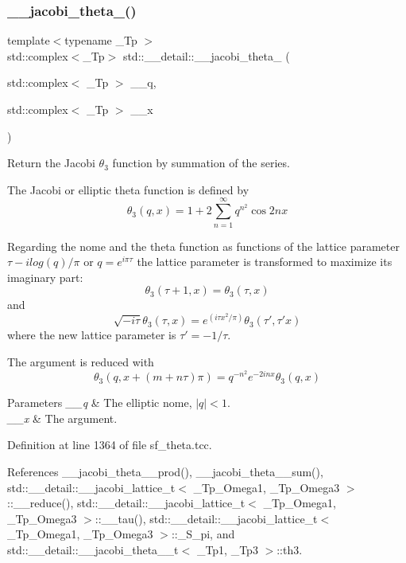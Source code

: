 \subsubsection{\texorpdfstring{\+\_\+\+\_\+jacobi\+\_\+theta\+\_()}{\_\_jacobi\_theta\_3()}\hspace{0.1cm}{\footnotesize\ttfamily [1/2]}}
{\footnotesize\ttfamily template$<$typename \+\_\+\+Tp $>$ \\
std\+::complex$<$\+\_\+\+Tp$>$ std\+::\+\_\+\+\_\+detail\+::\+\_\+\+\_\+jacobi\+\_\+theta\+\_ (\begin{DoxyParamCaption}\item[{std\+::complex$<$ \+\_\+\+Tp $>$}]{\+\_\+\+\_\+q,  }\item[{std\+::complex$<$ \+\_\+\+Tp $>$}]{\+\_\+\+\_\+x }\end{DoxyParamCaption})}

Return the Jacobi $ \theta_3 $ function by summation of the series.

The Jacobi or elliptic theta function is defined by \[ \theta_3(q,x) = 1 + 2\sum_{n=1}^{\infty} q^{n^2}\cos{2nx} \]

Regarding the nome and the theta function as functions of the lattice parameter $ \tau -i log(q)/ \pi $ or $ q = e^{i\pi\tau} $ the lattice parameter is transformed to maximize its imaginary part\+: \[ \theta_3(\tau+1,x) = \theta_3(\tau,x) \] and \[ \sqrt{-i\tau}\theta_3(\tau,x) = e^{(i\tau x^2/\pi)}\theta_3(\tau',\tau' x) \] where the new lattice parameter is $ \tau' = -1/\tau $.

The argument is reduced with \[ \theta_3(q, x + (m+n\tau)\pi) = q^{-n^2} e^{-2inx} \theta_3(q, x) \]


\begin{DoxyParams}{Parameters}
{\em \+\_\+\+\_\+q} & The elliptic nome, $ |q| < 1 $. \\
\hline
{\em \+\_\+\+\_\+x} & The argument. \\
\hline
\end{DoxyParams}


Definition at line 1364 of file sf\+\_\+theta.\+tcc.



References \+\_\+\+\_\+jacobi\+\_\+theta\+\_\+\_\+prod(), \+\_\+\+\_\+jacobi\+\_\+theta\+\_\+\_\+sum(), std\+::\+\_\+\+\_\+detail\+::\+\_\+\+\_\+jacobi\+\_\+lattice\+\_\+t$<$ \+\_\+\+Tp\+\_\+\+Omega1, \+\_\+\+Tp\+\_\+\+Omega3 $>$\+::\+\_\+\+\_\+reduce(), std\+::\+\_\+\+\_\+detail\+::\+\_\+\+\_\+jacobi\+\_\+lattice\+\_\+t$<$ \+\_\+\+Tp\+\_\+\+Omega1, \+\_\+\+Tp\+\_\+\+Omega3 $>$\+::\+\_\+\+\_\+tau(), std\+::\+\_\+\+\_\+detail\+::\+\_\+\+\_\+jacobi\+\_\+lattice\+\_\+t$<$ \+\_\+\+Tp\+\_\+\+Omega1, \+\_\+\+Tp\+\_\+\+Omega3 $>$\+::\+\_\+\+S\+\_\+pi, and std\+::\+\_\+\+\_\+detail\+::\+\_\+\+\_\+jacobi\+\_\+theta\+\_\+\_\+t$<$ \+\_\+\+Tp1, \+\_\+\+Tp3 $>$\+::th3.




